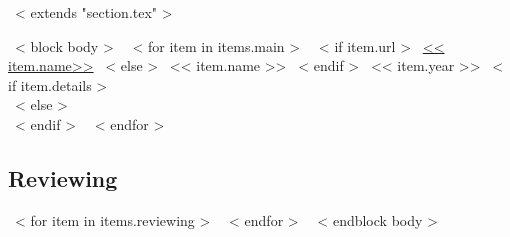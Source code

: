 ~< extends "section.tex" >~

~< block body >~
~< for item in items.main >~
  ~< if item.url >~
    \href{<< item.url >>}{<< item.name>>}
  ~< else >~
    << item.name >>
  ~< endif >~
  \hfill << item.year >>
  ~< if item.details >~
    \\ {\scriptsize \color{gray}{<< item.details >>}}
  ~< else >~
    \\[4.5mm]
  ~< endif >~
~< endfor >~

\subsection{Reviewing}
~< for item in items.reviewing >~
~< endfor >~
\vspace{1em}
~< endblock body >~